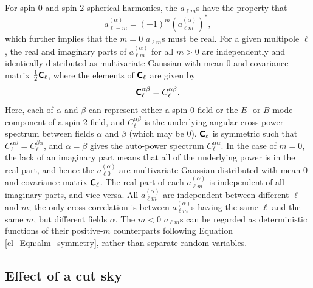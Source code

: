 For spin-0 and spin-2 spherical harmonics, the $a_{\ell m}$s have the property that
\begin{equation}
    a_{\ell -m}^{ \left( \alpha \right) } =
    \left( -1 \right)^m \left( a_{\ell m}^{ \left( \alpha \right) } \right)^*,
    \label{el_Eqn:alm_symmetry}
\end{equation}
which further implies that the $m = 0$ $a_{\ell m}$s must be real. For a given multipole $\ell$, the real and imaginary parts of $a_{\ell m}^{\left( \alpha \right)}$ for all $m > 0$ are  independently and identically distributed as multivariate Gaussian with mean $\mathbfit{0}$ and covariance matrix $\frac{1}{2} \bm{\mathsf{C}}_\ell$, where the elements of $\bm{\mathsf{C}}_\ell$ are given by
\begin{equation}
    \bm{\mathsf{C}}_\ell^{\alpha \beta} = C_\ell^{\alpha \beta}.
\end{equation}
Here, each of $\alpha$ and $\beta$ can represent either a spin-0 field or the $E$- or $B$-mode component of a spin-2 field, and $C_\ell^{\alpha \beta}$ is the underlying angular cross-power spectrum between fields $\alpha$ and $\beta$ (which may be 0). $\bm{\mathsf{C}}_\ell$ is symmetric such that $C_\ell^{\alpha \beta} = C_\ell^{\beta \alpha}$, and $\alpha = \beta$ gives the auto-power spectrum $C_\ell^{\alpha \alpha}$. In the case of $m = 0$, the lack of an imaginary part means that all of the underlying power is in the real part, and hence the $a_{\ell 0}^{\left( \alpha \right)}$ are multivariate Gaussian distributed with mean $\mathbfit{0}$ and covariance matrix $\bm{\mathsf{C}}_\ell$. The real part of each $a_{\ell m}^{\left( \alpha \right)}$ is independent of all imaginary parts, and vice versa. All $a_{\ell m}^{\left( \alpha \right)}$ are independent between different $\ell$ and $m$; the only cross-correlation is between $a_{\ell m}^{\left( \alpha \right)}$s having the same $\ell$ and the same $m$, but different fields $\alpha$. The $m < 0$ $a_{\ell m}$s can be regarded as deterministic functions of their positive-$m$ counterparts following Equation \eqref{el_Eqn:alm_symmetry}, rather than separate random variables.

\subsection{Effect of a cut sky}

